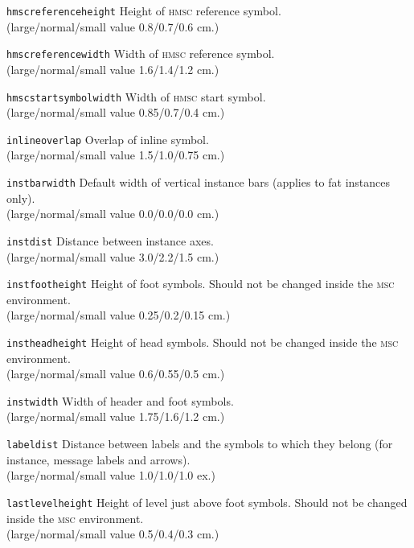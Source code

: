 \documentclass[a4paper]{article}
\newcommand{\cmd}[1]{\texttt{\bslash #1}}
\newcommand{\acro}[1]{{\scshape\lowercase{#1}}}
\newcommand\MSC{\acro{MSC}}
\newcommand\HMSC{\acro{HMSC}}
\newcommand{\lnsvalue}[3]{large/normal/small value #1/#2/#3}
\newenvironment{defs}{%
  \begin{list}{}%
              {\setlength{\labelwidth}{0pt}%
               \setlength{\labelsep}{1em}%
               \setlength{\leftmargin}{1em}%
               \setlength{\parsep}{1ex}%
               \setlength{\listparindent}{0pt}%
               \setlength{\rightmargin}{0pt}%
               \renewcommand{\makelabel}[1]{##1}%
               \raggedright%
              }%
  }{%
  \end{list}}
\begin{document}
\begin{defs}
\item[\cmd{hmscreferenceheight}]
Height of \HMSC{} reference symbol.\\
(\lnsvalue{0.8}{0.7}{0.6} cm.)

\item[\cmd{hmscreferencewidth}]
Width of \HMSC{} reference symbol.\\
(\lnsvalue{1.6}{1.4}{1.2} cm.)

\item[\cmd{hmscstartsymbolwidth}]
Width of \HMSC{} start symbol.\\
(\lnsvalue{0.85}{0.7}{0.4} cm.)

\item[\cmd{inlineoverlap}]
Overlap of inline symbol.\\
(\lnsvalue{1.5}{1.0}{0.75} cm.)

\item[\cmd{instbarwidth}]
Default width of vertical instance bars (applies to fat instances only).\\
(\lnsvalue{0.0}{0.0}{0.0} cm.)

\item[\cmd{instdist}]
Distance between instance axes.\\
(\lnsvalue{3.0}{2.2}{1.5} cm.)

\item[\cmd{instfootheight}] Height of foot symbols. Should not be
changed inside the \MSC{} environment.\\
(\lnsvalue{0.25}{0.2}{0.15} cm.)

\item[\cmd{instheadheight}] Height of head symbols. Should not be
changed inside the \MSC{} environment.\\
(\lnsvalue{0.6}{0.55}{0.5} cm.)

\item[\cmd{instwidth}]
Width of header and foot symbols.\\
(\lnsvalue{1.75}{1.6}{1.2} cm.)

\item[\cmd{labeldist}]
Distance between labels and the symbols to which they belong (for instance, message labels and arrows).\\
(\lnsvalue{1.0}{1.0}{1.0} ex.)

\item[\cmd{lastlevelheight}] Height of level just above foot
symbols. Should not be changed inside the \MSC{} environment.\\
(\lnsvalue{0.5}{0.4}{0.3} cm.)


\end{defs}
\end{document}
